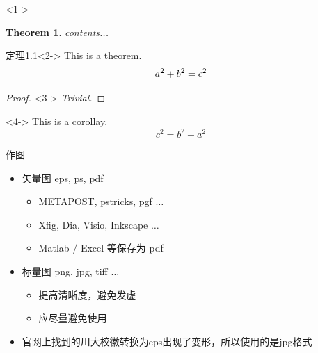\documentclass{beamer}
\newtheorem{thm}{Theorem}[theorem]
\begin{document}
\begin{frame}<1->
	\begin{thm}
		contents...
		\label{thm-1}
	\end{thm}
	\begin{block}{定理1.1}<2->
		This is a theorem.
		\begin{equation}
			a^2 + b^2 = c^2
			\notag	%
			\label{equ-3}
		\end{equation}
	\end{block}

	\begin{proof}<3->
		\textit{Trivial.}
	\end{proof}

	\begin{corollary}<4->
		This is a corollay.
		\begin{equation}
			c^2 = b^2 + a^2
			\label{equ-4}
		\end{equation}
	\end{corollary}
\end{frame}

\begin{frame}{作图}
	\begin{itemize}
		\item 矢量图 eps, ps, pdf
		      \begin{itemize}
			      \item METAPOST, pstricks, pgf $\ldots$
			      \item Xfig, Dia, Visio, Inkscape $\ldots$
			      \item Matlab / Excel 等保存为 pdf
		      \end{itemize}
		\item 标量图 png, jpg, tiff $\ldots$
		      \begin{itemize}
			      \item 提高清晰度，避免发虚
			      \item 应尽量避免使用
		      \end{itemize}
		\item 官网上找到的川大校徽转换为eps出现了变形，所以使用的是jpg格式
	\end{itemize}

\end{frame}
\end{document}
